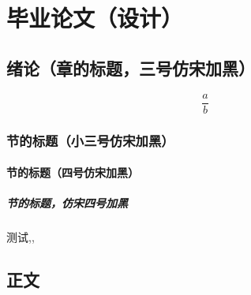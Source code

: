 %
\part{毕业论文（设计）}

\chapter{绪论（章的标题，三号仿宋加黑）}

{}

\begin{equation}
\frac{a}{b}
\end{equation}

\section{节的标题（小三号仿宋加黑）}

\subsection{节的标题（四号仿宋加黑）}

\subsubsection{节的标题，仿宋四号加黑}
测试\cite{small},\textcite{small},\parencite{small}

\chapter{正文}

